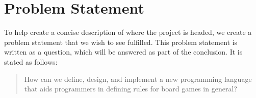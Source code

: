 \section{Problem Statement}
To help create a concise description of where the
project is headed, we create a problem statement
that we wish to see fulfilled. This problem
statement is written as a question, which will be
answered as part of the conclusion. It is stated
as follows:

\begin{quote}
  How can we define, design, and implement a new 
  programming language that aids programmers
  in defining rules for board games in general?
\end{quote}
